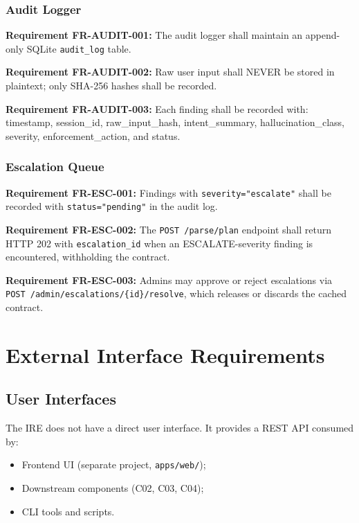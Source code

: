 ﻿\documentclass[10pt,journal,onecolumn]{IEEEtran}
\newcommand{\reqid}[1]{\textbf{#1}}
\begin{document}
\subsubsection{Audit Logger}
\reqid{Requirement FR-AUDIT-001:} The audit logger shall maintain an append-only SQLite \texttt{audit\_log} table.

\reqid{Requirement FR-AUDIT-002:} Raw user input shall NEVER be stored in plaintext; only SHA-256 hashes shall be recorded.

\reqid{Requirement FR-AUDIT-003:} Each finding shall be recorded with: timestamp, session\_id, raw\_input\_hash, intent\_summary, hallucination\_class, severity, enforcement\_action, and status.

\subsubsection{Escalation Queue}
\reqid{Requirement FR-ESC-001:} Findings with \texttt{severity="escalate"} shall be recorded with \texttt{status="pending"} in the audit log.

\reqid{Requirement FR-ESC-002:} The \texttt{POST /parse/plan} endpoint shall return HTTP 202 with \texttt{escalation\_id} when an ESCALATE-severity finding is encountered, withholding the contract.

\reqid{Requirement FR-ESC-003:} Admins may approve or reject escalations via \texttt{POST /admin/escalations/\{id\}/resolve}, which releases or discards the cached contract.
\section{External Interface Requirements}

\subsection{User Interfaces}
The IRE does not have a direct user interface. It provides a REST API consumed by:
\begin{itemize}
\item Frontend UI (separate project, \texttt{apps/web/});
\item Downstream components (C02, C03, C04);
\item CLI tools and scripts.
\end{itemize}
\end{document}
